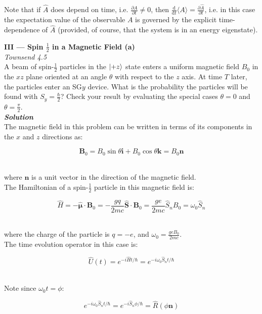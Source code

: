 \documentclass[14pt]{extarticle}
\renewcommand{\v}[1]{{\bm #1}}
\newcommand{\hv}[1]{\hat{\bm{#1}}}
\newcommand{\bfit}[1]{\textbf{\textit{#1}}}
\renewcommand{\d}{\text{d}}
\newcommand{\ddt}[1]{\frac{\d #1}{\d t}}
\newcommand{\pd}[2]{\frac{\partial #1}{\partial #2}}
\begin{document}
Note that if $\hat A$ does depend on time, i.e. $\pd{\hat A}{t} \neq 0$, then $\ddt{} \langle A \rangle = \pd{\hat A}{t}$, i.e. in this case the expectation value of the observable $A$ is governed by the explicit time-dependence of $\hat A$ (provided, of course, that the system is in an energy eigenstate). \\ 





\hrulefill 

\newpage

{\bf \LARGE III --- Spin $\frac 12$ in a Magnetic Field (a)} \\ 

{\it Townsend 4.5} \\ 
A beam of spin-$\frac 12$ particles in the $\ket{+z}$ state enters a uniform magnetic field $B_0$ in the $xz$ plane oriented at an angle $\theta$ with respect to the $z$ axis. At time $T$ later, the particles enter an SG$y$ device. What is the probability the particles will be found with $S_y = \frac \hbar 2$? Check your result by evaluating the special cases $\theta = 0$ and $\theta = \frac \pi 2$. \\ 


{\bfit{Solution}} \\ 
The magnetic field in this problem can be written in terms of its components in the $x$ and $z$ directions as:

$$\v B_0 = B_0 \sin\theta \v i + B_0 \cos\theta \v k = B_0 \v n$$ \

where $\v n$ is a unit vector in the direction of the magnetic field. \\

The Hamiltonian of a spin-$\frac 12$ particle in this magnetic field is:

$$\hat H = -\hv \mu \cdot \v B_0 = -\frac{gq}{2mc} \hv S \cdot \v B_0 = \frac{ge}{2mc} \hat S_n B_0 = \omega_0 \hat S_n$$ \ 

where the charge of the particle is $q = -e$, and $\omega_0 = \frac{ge B_0}{2mc}$. \\  

The time evolution operator in this case is:

$$\hat U(t) = e^{-i \hat H t / \hbar} = e^{-i \omega_0 \hat S_n t / \hbar}$$ \ 

Note since $\omega_0 t = \phi$:

$$e^{-i \omega_0 \hat S_n t / \hbar} = e^{-i \hat S_n \phi / \hbar} = \hat R(\phi \v n)$$ \ 
\end{document}
